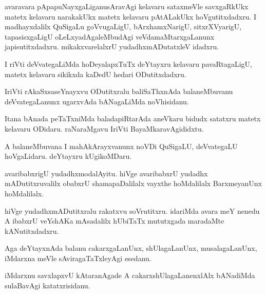 \documentclass{article}
\begin{document}
\begin{mng}%
avaravara pApapuNayxgaLiganusAravAgi kelavaru sataxmeVle savxgaRkUkx matetx kelavaru narakakUkx 
matetx kelavaru pAtALakUkx hoVgutitxdadxru. I madhayxdalilx QuSigaLu goVvugaLigU, bArxhamxNarigU, 
sitxrXVyarigU, tapasisxgaLigU oLeLxyadAgaleMbudAgi veVdamaMtarxgaLanunx japisutitxdadxru. 
mikakxvarelalxrU yudadhxmADutatxleV idadxru.
\end{mng}

\begin{mng}%
I riVti deVvategaLiMda hoDeyalapxTuTx deYtayxru kelavaru pavaRtagaLigU, matetx kelavaru sikikxda 
kaDedU hedari ODutitxdadxru.
\end{mng}

\begin{mng}%
IriVti rAkaSxsaseYnayxvu ODutitxralu baliSaThxnAda balaneMbuvanu deVvategaLanunx ugarxvAda 
bANagaLiMda noVhisidanu.
\end{mng}

\begin{mng}%
Itana bAnada peTaTxniMda baladapiRtarAda aneVkaru bidudx satatxru matetx kelavaru ODidaru. 
raNaraMgavu IriVti BayaMkaravAgididxtu.
\end{mng}

\begin{mng}%
A balaneMbuvana I mahAkArayxvanunx noVDi QuSigaLU, deVvategaLU hoVgaLidaru. deYtayxru kUgikoMDaru.
\end{mng}

\begin{mng}%
avaribabxrigU yudadhxmodalAyitu. hiVge avaribabxrU yudadhx mADutitxruvalilx obabxrU shamapaDalilalx 
vayxthe hoMdalilalx BarxmeyanUnx hoMdalilalx.
\end{mng}

\begin{mng}%
hiVge yudadhxmADutitxralu rakatxvu soVrutitxru. idariMda avara meY nenedu A ibabxrU veYshAKa 
mAsadalilx hUbiTaTx mututxgada maradaMte kANutitxdadxru.
\end{mng}

\begin{mng}%
Aga deYtayxnAda balanu cakarxgaLanUnx, shUlagaLanUnx, musalagaLanUnx, iMdarxna meVle 
sAviragaTaTxleyAgi esedanu.
\end{mng}

\begin{mng}%
iMdarxnu savxlapxvU kAtaranAgade A cakarxshUlagaLanenxlAlx bANadiMda sulaBavAgi katatxrisidanu.
\end{mng}
\end{document}
